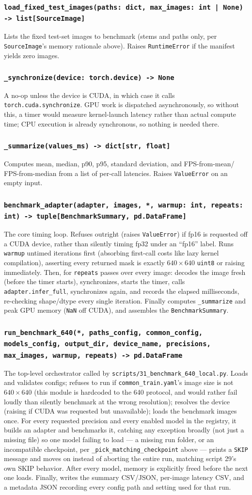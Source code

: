 \documentclass[11pt]{article}
\newcommand{\func}[1]{\subsubsection*{\texttt{#1}}}
\begin{document}
\func{load\_fixed\_test\_images(paths: dict, max\_images: int | None) -> list[SourceImage]}
Lists the fixed test-set images to benchmark (stems and paths only, per
\texttt{SourceImage}'s memory rationale above). Raises \texttt{RuntimeError} if
the manifest yields zero images.

\func{\_synchronize(device: torch.device) -> None}
A no-op unless the device is CUDA, in which case it calls
\texttt{torch.cuda.synchronize}. GPU work is dispatched asynchronously, so
without this, a timer would measure kernel-launch latency rather than actual
compute time; CPU execution is already synchronous, so nothing is needed there.

\func{\_summarize(values\_ms) -> dict[str, float]}
Computes mean, median, p90, p95, standard deviation, and FPS-from-mean/
FPS-from-median from a list of per-call latencies. Raises \texttt{ValueError} on
an empty input.

\func{benchmark\_adapter(adapter, images, *, warmup: int, repeats: int) -> tuple[BenchmarkSummary, pd.DataFrame]}
The core timing loop. Refuses outright (raises \texttt{ValueError}) if fp16 is
requested off a CUDA device, rather than silently timing fp32 under an
``fp16'' label. Runs \texttt{warmup} untimed iterations first (absorbing
first-call costs like lazy kernel compilation), asserting every returned mask
is exactly $640{\times}640$ \texttt{uint8} or raising immediately. Then, for
\texttt{repeats} passes over every image: decodes the image fresh (before the
timer starts), synchronizes, starts the timer, calls
\texttt{adapter.infer\_full}, synchronizes again, and records the elapsed
milliseconds, re-checking shape/dtype every single iteration. Finally computes
\texttt{\_summarize} and peak GPU memory (\texttt{NaN} off CUDA), and assembles
the \texttt{BenchmarkSummary}.

\func{run\_benchmark\_640(*, paths\_config, common\_config, models\_config, output\_dir, device\_name, precisions, max\_images, warmup, repeats) -> pd.DataFrame}
The top-level orchestrator called by \texttt{scripts/31\_benchmark\_640\_local.py}.
Loads and validates configs; refuses to run if \texttt{common\_train.yaml}'s
image size is not $640{\times}640$ (this module is hardcoded to the 640
protocol, and would rather fail loudly than silently benchmark at the wrong
resolution); resolves the device (raising if CUDA was requested but
unavailable); loads the benchmark images once. For every requested precision
and every enabled model in the registry, it builds an adapter and benchmarks
it, catching any exception broadly (not just a missing file) so one model
failing to load --- a missing run folder, or an incompatible checkpoint, per
\texttt{\_pick\_matching\_checkpoint} above --- prints a \texttt{SKIP} message
and moves on instead of aborting the entire run, matching script 29's own
SKIP behavior. After every model, memory is explicitly freed before the next
one loads. Finally, writes the summary CSV/JSON, per-image latency CSV, and a
metadata JSON recording every config path and setting used for that run.
\end{document}
